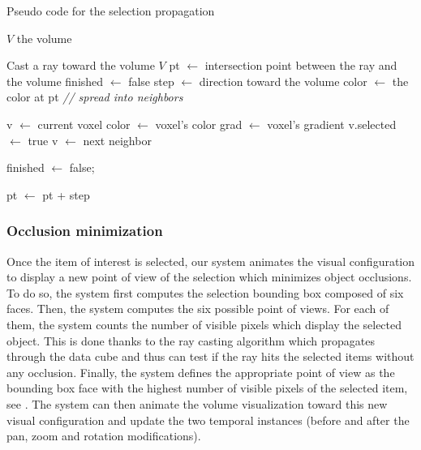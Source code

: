\begin{algorithm} \caption{Pseudo code for the selection propagation} 
\label{alg:propagation}
\begin{algorithmic}[1]
\Require $V$ the volume

\State Cast a ray toward the volume $V$  
\State  pt $\leftarrow$ intersection point between the ray and the volume \;
\State  finished $\leftarrow$ false \;
 	\State step $\leftarrow$ direction toward the volume \;
  	\State color $\leftarrow$ the color at pt \;
	\State \emph{// spread into neighbors}
    
    \State v $\leftarrow$ current voxel \;
    	\State color $\leftarrow$ voxel's color \;
        \State grad $\leftarrow$ voxel's gradient\;
         \State 	v.selected $\leftarrow$ true \;
         \EndIf
        \State  v $\leftarrow$ next neighbor \;
    \EndWhile    

    \State finished $\leftarrow$ false;
    
  \EndIf
 \State  pt $\leftarrow$ pt + step \;
\EndWhile
 
\EndIf

\end{algorithmic}
\end{algorithm}




\subsubsection{Occlusion minimization}

Once the item of interest is selected, our system animates the visual configuration to display a new point of view of the selection which minimizes object occlusions. To do so, the system first computes the selection bounding box composed of six faces. Then, the system computes the six possible point of views. For each of them, the system counts the number of visible pixels which display the selected object. This is done thanks to the ray casting algorithm which propagates through the data cube and thus can test if the ray hits the selected items without any occlusion. Finally, the system defines the appropriate point of view as the bounding box face with the highest number of visible pixels of the selected item, see \cite{hurter2017selective}.
The system can then animate the volume visualization toward this new visual configuration and update the two temporal instances (before and after the pan, zoom and rotation modifications).

